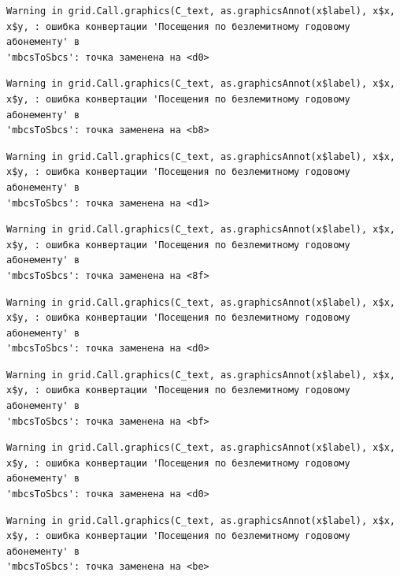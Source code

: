 \documentclass[
  letterpaper,
  DIV=11,
  numbers=noendperiod]{scrreprt}
\begin{document}
\begin{verbatim}
Warning in grid.Call.graphics(C_text, as.graphicsAnnot(x$label), x$x,
x$y, : ошибка конвертации 'Посещения по безлемитному годовому абонементу' в
'mbcsToSbcs': точка заменена на <d0>
\end{verbatim}

\begin{verbatim}
Warning in grid.Call.graphics(C_text, as.graphicsAnnot(x$label), x$x,
x$y, : ошибка конвертации 'Посещения по безлемитному годовому абонементу' в
'mbcsToSbcs': точка заменена на <b8>
\end{verbatim}

\begin{verbatim}
Warning in grid.Call.graphics(C_text, as.graphicsAnnot(x$label), x$x,
x$y, : ошибка конвертации 'Посещения по безлемитному годовому абонементу' в
'mbcsToSbcs': точка заменена на <d1>
\end{verbatim}

\begin{verbatim}
Warning in grid.Call.graphics(C_text, as.graphicsAnnot(x$label), x$x,
x$y, : ошибка конвертации 'Посещения по безлемитному годовому абонементу' в
'mbcsToSbcs': точка заменена на <8f>
\end{verbatim}

\begin{verbatim}
Warning in grid.Call.graphics(C_text, as.graphicsAnnot(x$label), x$x,
x$y, : ошибка конвертации 'Посещения по безлемитному годовому абонементу' в
'mbcsToSbcs': точка заменена на <d0>
\end{verbatim}

\begin{verbatim}
Warning in grid.Call.graphics(C_text, as.graphicsAnnot(x$label), x$x,
x$y, : ошибка конвертации 'Посещения по безлемитному годовому абонементу' в
'mbcsToSbcs': точка заменена на <bf>
\end{verbatim}

\begin{verbatim}
Warning in grid.Call.graphics(C_text, as.graphicsAnnot(x$label), x$x,
x$y, : ошибка конвертации 'Посещения по безлемитному годовому абонементу' в
'mbcsToSbcs': точка заменена на <d0>
\end{verbatim}

\begin{verbatim}
Warning in grid.Call.graphics(C_text, as.graphicsAnnot(x$label), x$x,
x$y, : ошибка конвертации 'Посещения по безлемитному годовому абонементу' в
'mbcsToSbcs': точка заменена на <be>
\end{verbatim}
\end{document}
